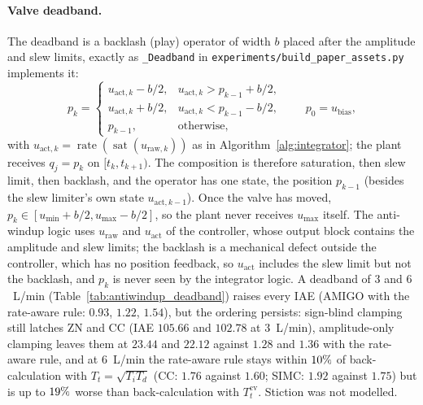 \documentclass[11pt]{article}
\begin{document}
\paragraph{Valve deadband.} The deadband is a backlash (play) operator of width $b$ placed after the amplitude and slew limits, exactly as \texttt{\_Deadband} in \texttt{experiments/build\_paper\_assets.py} implements it:
\begin{equation}
    p_k = \begin{cases}
        u_{\text{act},k} - b/2, & u_{\text{act},k} > p_{k-1} + b/2, \\
        u_{\text{act},k} + b/2, & u_{\text{act},k} < p_{k-1} - b/2, \\
        p_{k-1}, & \text{otherwise},
    \end{cases}
    \qquad p_0 = u_{\text{bias}},
    \label{eq:backlash}
\end{equation}
with $u_{\text{act},k} = \operatorname{rate}(\operatorname{sat}(u_{\text{raw},k}))$ as in Algorithm~\ref{alg:integrator}; the plant receives $q_j = p_k$ on $[t_k, t_{k+1})$. The composition is therefore saturation, then slew limit, then backlash, and the operator has one state, the position $p_{k-1}$ (besides the slew limiter's own state $u_{\text{act},k-1}$). Once the valve has moved, $p_k \in [u_{\min} + b/2, u_{\max} - b/2]$, so the plant never receives $u_{\max}$ itself. The anti-windup logic uses $u_{\text{raw}}$ and $u_{\text{act}}$ of the controller, whose output block contains the amplitude and slew limits; the backlash is a mechanical defect outside the controller, which has no position feedback, so $u_{\text{act}}$ includes the slew limit but not the backlash, and $p_k$ is never seen by the integrator logic. A deadband of $3$ and $6$~L/min (Table~\ref{tab:antiwindup_deadband}) raises every IAE (AMIGO with the rate-aware rule: $0.93$, $1.22$, $1.54$), but the ordering persists: sign-blind clamping still latches ZN and CC (IAE $105.66$ and $102.78$ at $3$~L/min), amplitude-only clamping leaves them at $23.44$ and $22.12$ against $1.28$ and $1.36$ with the rate-aware rule, and at $6$~L/min the rate-aware rule stays within $10\%$ of back-calculation with $T_t = \sqrt{T_iT_d}$ (CC: $1.76$ against $1.60$; SIMC: $1.92$ against $1.75$) but is up to $19\%$ worse than back-calculation with $T_t^{\mathrm{cv}}$. Stiction was not modelled.


\end{document}
